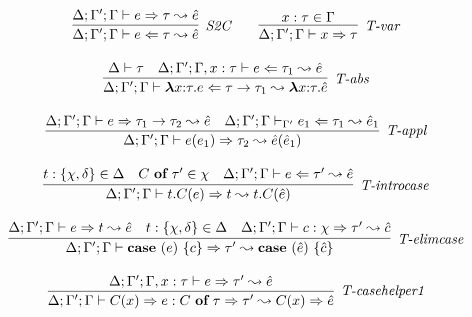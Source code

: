 \begin{figure}
\vspace{-15px}
\centering
\[
\begin{array}{c}
\infer[\textit{S2C}]
	{\Delta; \Gamma'; \Gamma \vdash  e \Leftarrow \tau \leadsto \hat{e}} 
	{\Delta; \Gamma'; \Gamma \vdash e \Rightarrow \tau \leadsto \hat{e}   }
~~~~~~
\infer[\textit{T-var}]
	{\Delta; \Gamma'; \Gamma \vdash x\Rightarrow\tau } 
	{x:\tau \in \Gamma }\\[3ex]

\infer[\textit{T-abs}]
	{\Delta; \Gamma'; \Gamma \vdash  \boldsymbol\lambda x{:}\tau . e \Leftarrow \tau \rightarrow \tau_1 \leadsto \boldsymbol\lambda x{:}\tau .\hat{e}} 
	{\Delta\vdash \tau & \Delta; \Gamma'; \Gamma, x:\tau \vdash e\Leftarrow \tau_1 \leadsto \hat{e}}\\[3ex]

\infer[\textit{T-appl}]
	{\Delta; \Gamma'; \Gamma \vdash  e(e_1) \Rightarrow \tau_2  \leadsto \hat{e}(\hat{e}_1) } 
	{\Delta; \Gamma'; \Gamma \vdash e \Rightarrow \tau_1 \rightarrow \tau_2  \leadsto \hat{e}  & \Delta; \Gamma'; \Gamma \vdash_{\Gamma'} e_1 \Leftarrow \tau_1 \leadsto \hat{e}_1 }\\[3ex]

\infer[\textit{T-introcase}]
	{\Delta; \Gamma'; \Gamma \vdash  t.C(e) \Rightarrow t  \leadsto t.C(\hat{e}) } 
	{t:\{\chi, \delta\} \in \Delta & C\ \keyw{of}\ \tau' \in \chi &\Delta; \Gamma'; \Gamma \vdash e \Leftarrow \tau'  \leadsto \hat{e}}\\[3ex]

\infer[\textit{T-elimcase}]
	{\Delta; \Gamma'; \Gamma \vdash  \keyw{case}~(e)~\{ c \} \Rightarrow \tau'  \leadsto \keyw{case}~(\hat{e})~\{ \hat{c} \} } 
	{\Delta; \Gamma'; \Gamma \vdash e \Rightarrow t  \leadsto \hat{e}  & t:\{ \chi,\delta\} \in \Delta & \Delta; \Gamma'; \Gamma \vdash c:\chi \Rightarrow \tau' \leadsto \hat{c}}\\[3ex]

\infer[\textit{T-casehelper1}]
	{\Delta; \Gamma'; \Gamma \vdash  C(x)\Rightarrow e : C\ \keyw{of}\ \tau \Rightarrow \tau' \leadsto C(x)\Rightarrow \hat{e}} 
	{\Delta; \Gamma'; \Gamma, x:\tau \vdash e \Rightarrow \tau' \leadsto \hat{e}}\\[3ex]


\end{array}\]
\end{figure}
